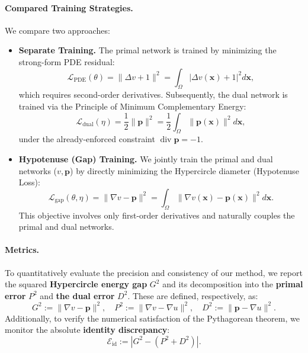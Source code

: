 \documentclass[12pt, a4paper]{article}
\DeclareMathOperator{\divg}{div}
\begin{document}
\paragraph{Compared Training Strategies.}
We compare two approaches:
\begin{itemize}
    \item \textbf{Separate Training.}
    The primal network is trained by minimizing the strong-form PDE residual:
    \begin{equation}
        \mathcal{L}_{\text{PDE}}(\theta) = \| \Delta v + 1 \|^2 = \int_{\Omega} | \Delta v(\mathbf{x}) + 1 |^2 d\mathbf{x},
    \end{equation}
    which requires second-order derivatives. Subsequently, the dual network is trained via the Principle of Minimum Complementary Energy:
    \begin{equation}
        \mathcal{L}_{\text{dual}}(\eta) = \frac{1}{2} \| \mathbf{p} \|^2 = \frac{1}{2} \int_{\Omega} \| \mathbf{p}(\mathbf{x}) \|^2 d\mathbf{x},
    \end{equation}
    under the already-enforced constraint $\divg \mathbf{p} = -1$.

    \item \textbf{Hypotenuse (Gap) Training.}
    We jointly train the primal and dual networks ($v, \mathbf{p}$) by directly minimizing the Hypercircle diameter (Hypotenuse Loss):
    \begin{equation}
        \mathcal{L}_{\text{gap}}(\theta, \eta) = \| \nabla v - \mathbf{p} \|^2 = \int_{\Omega} \| \nabla v(\mathbf{x}) - \mathbf{p}(\mathbf{x}) \|^2 d\mathbf{x}.
    \end{equation}
    This objective involves only first-order derivatives and naturally couples the primal and dual networks.
\end{itemize}

\paragraph{Metrics.}
To quantitatively evaluate the precision and consistency of our method, we report the squared \textbf{Hypercircle energy gap} $G^2$ and its decomposition into the \textbf{primal error} $P^2$ and \textbf{the dual error} $D^2$. These are defined, respectively, as:
\begin{equation}
    G^2 := \| \nabla v - \mathbf{p} \|^2, \quad
    P^2 := \| \nabla v - \nabla u \|^2, \quad
    D^2 := \| \mathbf{p} - \nabla u \|^2.
\end{equation}
Additionally, to verify the numerical satisfaction of the Pythagorean theorem, we monitor the absolute \textbf{identity discrepancy}:
\begin{equation}
    \mathcal{E}_{\text{id}} := \left| G^2 - (P^2 + D^2) \right|.
\end{equation}
\end{document}
